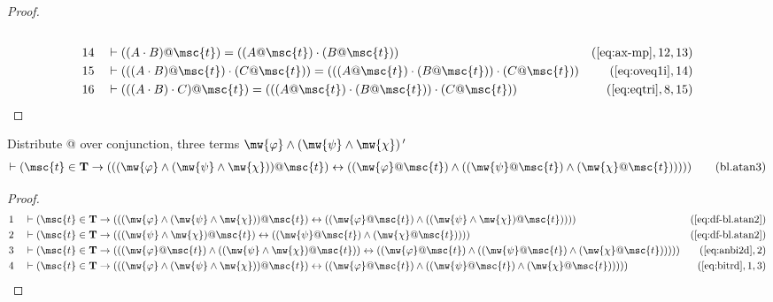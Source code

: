 \begin{proof}
\begin{align}
  \\ 14 &&  & \vdash ( ( A \cdot B ) @ \msc{t} ) = ( ( A @ \msc{t} ) \cdot ( B @ \msc{t} ) )&(\mbox{\ref{eq:ax-mp}},12,13)\notag
  \\ 15 &&  & \vdash ( ( ( A \cdot B ) @ \msc{t} ) \cdot ( C @ \msc{t} ) ) = ( ( ( A @ \msc{t} ) \cdot ( B @ \msc{t} ) ) \cdot ( C @ \msc{t} ) )&(\mbox{\ref{eq:oveq1i}},14)\notag
  \\ 16 &&  & \vdash ( ( ( A \cdot B ) \cdot C ) @ \msc{t} ) = ( ( ( A @ \msc{t} ) \cdot ( B @ \msc{t} ) ) \cdot ( C @ \msc{t} ) )&(\mbox{\ref{eq:eqtri}},8,15)\notag
\end{align}
\end{proof}

\begin{lemma} Distribute @ over conjunction, three terms
$\mw{\varphi} \wedge ( \mw{\psi} \wedge \mw{\chi} ) \,\mathrm{{\tt '}}$
\begin{align}
\vdash ( \msc{t} \in \mathbf{T} \rightarrow ( ( ( \mw{\varphi} \wedge (
    \mw{\psi} \wedge \mw{\chi} ) ) @ \msc{t} ) \leftrightarrow ( ( \mw{\varphi}
    @ \msc{t} ) \wedge ( ( \mw{\psi} @ \msc{t} ) \wedge ( \mw{\chi} @ \msc{t} )
    ) ) ) )\label{eq:bl.atan3}\tag{bl.atan3}
\end{align}
\end{lemma}

\begin{proof}
\begin{align}
  1 &&  & \vdash ( \msc{t} \in \mathbf{T} \rightarrow ( ( ( \mw{\varphi} \wedge ( \mw{\psi} \wedge \mw{\chi} ) ) @ \msc{t} ) \leftrightarrow ( ( \mw{\varphi} @ \msc{t} ) \wedge ( ( \mw{\psi} \wedge \mw{\chi} ) @ \msc{t} ) ) ) )&(\mbox{\ref{eq:df-bl.atan2}})\notag
  \\ 2 &&  & \vdash ( \msc{t} \in \mathbf{T} \rightarrow ( ( ( \mw{\psi} \wedge \mw{\chi} ) @ \msc{t} ) \leftrightarrow ( ( \mw{\psi} @ \msc{t} ) \wedge ( \mw{\chi} @ \msc{t} ) ) ) )&(\mbox{\ref{eq:df-bl.atan2}})\notag
  \\ 3 &&  & \vdash ( \msc{t} \in \mathbf{T} \rightarrow ( ( ( \mw{\varphi} @ \msc{t} ) \wedge ( ( \mw{\psi} \wedge \mw{\chi} ) @ \msc{t} ) ) \leftrightarrow ( ( \mw{\varphi} @ \msc{t} ) \wedge ( ( \mw{\psi} @ \msc{t} ) \wedge ( \mw{\chi} @ \msc{t} ) ) ) ) )&(\mbox{\ref{eq:anbi2d}},2)\notag
  \\ 4 &&  & \vdash ( \msc{t} \in \mathbf{T} \rightarrow ( ( ( \mw{\varphi} \wedge ( \mw{\psi} \wedge \mw{\chi} ) ) @ \msc{t} ) \leftrightarrow ( ( \mw{\varphi} @ \msc{t} ) \wedge ( ( \mw{\psi} @ \msc{t} ) \wedge ( \mw{\chi} @ \msc{t} ) ) ) ) )&(\mbox{\ref{eq:bitrd}},1,3)\notag
\end{align}
\end{proof}

